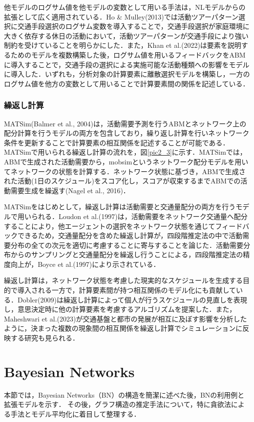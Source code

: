他モデルのログサム値を他モデルの変数として用いる手法は，NLモデルからの拡張として広く適用されている．Ho \& Mulley(2013)では活動ツアーパターン選択に交通手段選択のログサム変数を導入することで，交通手段選択が家庭環境に大きく依存する休日の活動において，活動ツアーパターンが交通手段により強い制約を受けていることを明らかにした．また，Khan et al.(2022)は要素を説明するためのモデルを複数構築した後，ログサム値を用いるフィードバックをABMに導入することで，交通手段の選択による実施可能な活動種類への影響をモデルに導入した．いずれも，分析対象の計算要素に離散選択モデルを構築し，一方のログサム値を他方の変数として用いることで計算要素間の関係を記述している．

\subsubsection{繰返し計算}
MATSim(Balmer et al., 2004)は，活動需要予測を行うABMとネットワーク上の配分計算を行うモデルの両方を包含しており，繰り返し計算を行いネットワーク条件を更新することで計算要素の相互関係を記述することが可能である．MATSimで用いられる繰返し計算の流れを，図\ref{pic2_3}に示す．MATSimでは，ABMで生成された活動需要から，mobsimというネットワーク配分モデルを用いてネットワークの状態を計算する．ネットワーク状態に基づき，ABMで生成された活動(1日のスケジュール)をスコア化し，スコアが収束するまでABMでの活動需要生成を繰返す(Nagel et al., 2016)．

MATSimをはじめとして，繰返し計算は活動需要と交通量配分の両方を行うモデルで用いられる．Loudon et al.(1997)は，活動需要をネットワーク交通量へ配分することにより，他エージェントの選択をネットワーク状態を通じてフィードバックできるため，交通量配分を含めた繰返し計算が，四段階推定法の中で活動需要分布の全ての次元を適切に考慮することに寄与することを論じた．活動需要分布からのサンプリングと交通量配分を繰返し行うことによる，四段階推定法の精度向上が，Boyce et al.(1997)により示されている．

繰返し計算は，ネットワーク状態を考慮した現実的なスケジュールを生成する目的で導入される一方で，計算要素間が持つ相互関係のモデル化にも貢献している．Dobler(2009)は繰返し計算によって個人が行うスケジュールの見直しを表現し，意思決定時に他の計算要素を考慮するアルゴリズムを提案した．また，Maheshwari et al.(2023)が交通基盤と都市の発展が相互に及ぼす影響を分析したように，決まった複数の現象間の相互関係を繰返し計算でシミュレーションに反映する研究も見られる．




\section{Bayesian Networks}\label{2.2}
本節では，Bayesian Networks（BN）の構造を簡潔に述べた後，BNの利用例と拡張モデルを示す．
その後，グラフ構造の推定手法について，特に貪欲法による手法とモデル平均化に着目して整理する．

